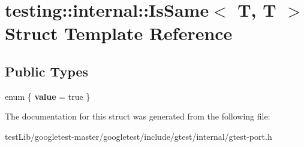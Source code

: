 \hypertarget{structtesting_1_1internal_1_1IsSame_3_01T_00_01T_01_4}{}\section{testing\+:\+:internal\+:\+:Is\+Same$<$ T, T $>$ Struct Template Reference}
\label{structtesting_1_1internal_1_1IsSame_3_01T_00_01T_01_4}
\subsection*{Public Types}
\begin{DoxyCompactItemize}
\item 
\mbox{\label{structtesting_1_1internal_1_1IsSame_3_01T_00_01T_01_4_ac0d986abcf98ce8eb16fbb9da6d1e6c4}} 
enum \{ {\bfseries value} = true
 \}
\end{DoxyCompactItemize}


The documentation for this struct was generated from the following file\+:\begin{DoxyCompactItemize}
\item 
test\+Lib/googletest-\/master/googletest/include/gtest/internal/gtest-\/port.\+h\end{DoxyCompactItemize}
